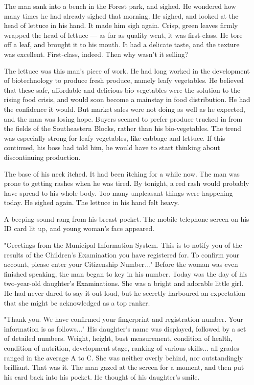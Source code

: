 The man sank into a bench in the Forest park, and sighed. He wondered
how many times he had already sighed that morning. He sighed, and looked
at the head of lettuce in his hand. It made him sigh again. Crisp, green
leaves firmly wrapped the head of lettuce ― as far as quality went, it
was first-class. He tore off a leaf, and brought it to his mouth. It had
a delicate taste, and the texture was excellent. First-class, indeed.
Then why wasn't it selling?

The lettuce was this man's piece of work. He had long worked in the
development of biotechnology to produce fresh produce, namely leafy
vegetables. He believed that these safe, affordable and delicious
bio-vegetables were the solution to the rising food crisis, and would
soon become a mainstay in food distribution. He had the confidence it
would. But market sales were not doing as well as he expected, and the
man was losing hope. Buyers seemed to prefer produce trucked in from the
fields of the Southeastern Blocks, rather than his bio-vegetables. The
trend was especially strong for leafy vegetables, like cabbage and
lettuce. If this continued, his boss had told him, he would have to
start thinking about discontinuing production.

The base of his neck itched. It had been itching for a while now. The
man was prone to getting rashes when he was tired. By tonight, a red
rash would probably have spread to his whole body. Too many unpleasant
things were happening today. He sighed again. The lettuce in his hand
felt heavy.

A beeping sound rang from his breast pocket. The mobile telephone screen
on his ID card lit up, and young woman's face appeared.

"Greetings from the Municipal Information System. This is to notify you
of the results of the Children's Examination you have registered for. To
confirm your account, please enter your Citizenship Number..." Before
the woman was even finished speaking, the man began to key in his
number. Today was the day of his two-year-old daughter's Examinations.
She was a bright and adorable little girl. He had never dared to say it
out loud, but he secretly harboured an expectation that she might be
acknowledged as a top ranker.

"Thank you. We have confirmed your fingerprint and registration number.
Your information is as follows..." His daughter's name was displayed,
followed by a set of detailed numbers. Weight, height, bust measurement,
condition of health, condition of nutrition, development stage, ranking
of various skills... all grades ranged in the average A to C. She was
neither overly behind, nor outstandingly brilliant. That was it. The man
gazed at the screen for a moment, and then put his card back into his
pocket. He thought of his daughter's smile.


